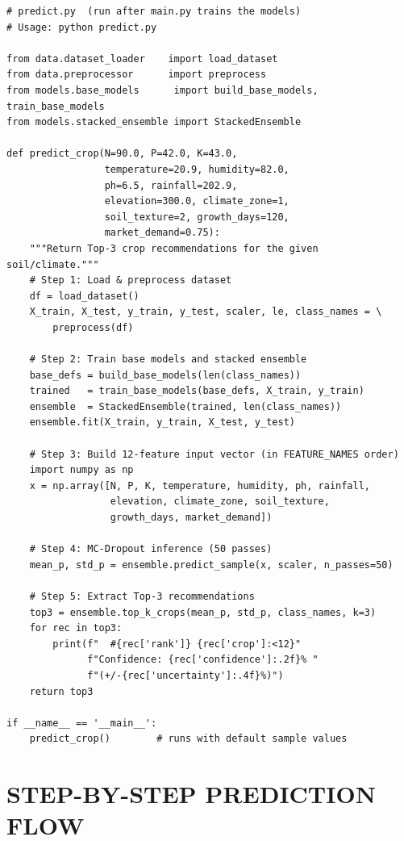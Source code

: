 \documentclass[12pt,a4paper,oneside]{report}
\begin{document}
\begin{singlespacing}
\begin{lstlisting}[caption={predict.py --- Call predict\_crop() to get Top-3 recommendations}]
# predict.py  (run after main.py trains the models)
# Usage: python predict.py

from data.dataset_loader    import load_dataset
from data.preprocessor      import preprocess
from models.base_models      import build_base_models, train_base_models
from models.stacked_ensemble import StackedEnsemble

def predict_crop(N=90.0, P=42.0, K=43.0,
                 temperature=20.9, humidity=82.0,
                 ph=6.5, rainfall=202.9,
                 elevation=300.0, climate_zone=1,
                 soil_texture=2, growth_days=120,
                 market_demand=0.75):
    """Return Top-3 crop recommendations for the given soil/climate."""
    # Step 1: Load & preprocess dataset
    df = load_dataset()
    X_train, X_test, y_train, y_test, scaler, le, class_names = \
        preprocess(df)

    # Step 2: Train base models and stacked ensemble
    base_defs = build_base_models(len(class_names))
    trained   = train_base_models(base_defs, X_train, y_train)
    ensemble  = StackedEnsemble(trained, len(class_names))
    ensemble.fit(X_train, y_train, X_test, y_test)

    # Step 3: Build 12-feature input vector (in FEATURE_NAMES order)
    import numpy as np
    x = np.array([N, P, K, temperature, humidity, ph, rainfall,
                  elevation, climate_zone, soil_texture,
                  growth_days, market_demand])

    # Step 4: MC-Dropout inference (50 passes)
    mean_p, std_p = ensemble.predict_sample(x, scaler, n_passes=50)

    # Step 5: Extract Top-3 recommendations
    top3 = ensemble.top_k_crops(mean_p, std_p, class_names, k=3)
    for rec in top3:
        print(f"  #{rec['rank']} {rec['crop']:<12}"
              f"Confidence: {rec['confidence']:.2f}% "
              f"(+/-{rec['uncertainty']:.4f}%)")
    return top3

if __name__ == '__main__':
    predict_crop()        # runs with default sample values
\end{lstlisting}
\end{singlespacing}

\section{STEP-BY-STEP PREDICTION FLOW}
\end{document}
